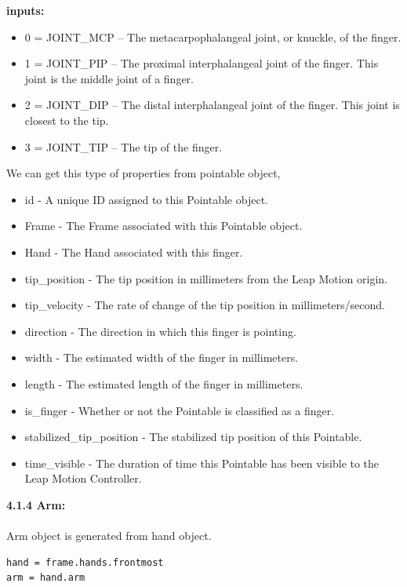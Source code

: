 \documentclass[11pt,a4paper]{article}
\newcommand\tab[1][1cm]{\hspace*{#1}}
\begin{document}
\textbf{inputs:}
\begin{itemize}
    \item 0 = JOINT\_MCP – The metacarpophalangeal joint, or knuckle, of the finger.
    \item 1 = JOINT\_PIP – The proximal interphalangeal joint of the finger. This joint is the middle joint of a finger.
    \item 2 = JOINT\_DIP – The distal interphalangeal joint of the finger. This joint is closest to the tip.
    \item 3 = JOINT\_TIP – The tip of the finger.
\end{itemize}
\vspace{1cm}
We can get this type of properties from pointable object,
\begin{itemize}
    \item id  -  A unique ID assigned to this Pointable object.
    \item Frame - The Frame associated with this Pointable object.
    \item Hand - The Hand associated with this finger.
    \item tip\_position - The tip position in millimeters from the Leap Motion origin.
    \item tip\_velocity - The rate of change of the tip position in millimeters/second.
    \item direction - The direction in which this finger is pointing.
    \item width - The estimated width of the finger in millimeters.
    \item length - The estimated length of the finger in millimeters.
    \item is\_finger - Whether or not the Pointable is classified as a finger.
    \item stabilized\_tip\_position - The stabilized tip position of this Pointable.
    \item time\_visible - The duration of time this Pointable has been visible to the Leap Motion Controller.
\end{itemize}
\vspace{2cm}
    \textbf{\Large{4.1.4 Arm:}}
	\vspace{0.5cm}\\
	\tab{There is also an arm object which gives data related elbow\_position, arm.wrist\_position, width, direction, the basis of all three axises.}\\
	\vspace{.5cm}
	Arm object is generated from hand object.
	\begin{lstlisting}
hand = frame.hands.frontmost
arm = hand.arm
\end{lstlisting}
\vspace{1cm}
\end{document}
